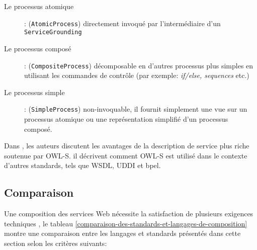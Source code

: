   \renewcommand{\descriptionlabel}[1]{\hspace{0.5cm}\textbullet~\textsf{#1}}
  \begin{description}
  \item[Le processus atomique]: (\verb|AtomicProcess|) directement
    invoqué par l'intermédiaire d'un \verb|ServiceGrounding|

  \item[Le processus composé]: (\verb|CompositeProcess|) décomposable
    en d'autres processus plus simples en utilisant les commandes de
    contrôle (par exemple: \textit{if/else, sequences} etc.)

  \item[Le processus simple]: (\verb|SimpleProcess|) non-invoquable,
    il fournit simplement une vue sur un processus atomique ou une
    représentation simplifié d'un processus composé.
  \end{description}
  \enddescription

  Dans \cite{martin2004owl}, les auteurs discutent les avantages de la
  description de service plus riche soutenue par \textsc{OWL-S}. il
  décrivent comment \textsc{OWL-S} est utilisé dans le contexte d'autres
  standards, tels que \textsc{WSDL}, \textsc{UDDI} et \acrshort{bpel}.

  \subsection{Comparaison}
  \label{sec:langs-comparaison}
  Une composition des services Web nécessite la satisfaction de
  plusieurs exigences techniques \cite{sheng2014web,
    bucchiarone2006survey} , le tableau
  \ref{comparaison-des-standards-et-langages-de-composition} montre une
  comparaison entre les langages et standards présentés dans cette
  section selon les critères suivants:

  

